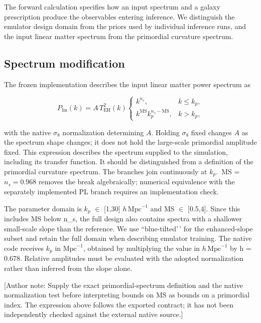 The forward calculation specifies how an input spectrum and a galaxy prescription produce the observables entering inference. We distinguish the emulator design domain from the priors used by individual inference runs, and the input linear matter spectrum from the primordial curvature spectrum.

\subsection{Spectrum modification}\label{spectrum-modification}

The frozen implementation describes the input linear matter power spectrum as

\[
P_{\mathrm{lin}}(k)=A\,T_{\mathrm{EH}}^2(k)
\begin{cases}
k^{n_s}, & k\leq k_p,\\
k^{\mathrm{MS}}k_p^{n_s-\mathrm{MS}}, & k>k_p,
\end{cases}
\]

with the native $\sigma_8$ normalization determining $A$. Holding $\sigma_8$ fixed changes $A$ as the spectrum shape changes; it does not hold the large-scale primordial amplitude fixed. This expression describes the spectrum supplied to the simulation, including its transfer function. It should be distinguished from a definition of the primordial curvature spectrum. The branches join continuously at \ensuremath{k_p}.~MS = $n_s=0.968$ removes the break algebraically; numerical equivalence with the separately implemented PL branch requires an implementation check.

The parameter domain is \ensuremath{k_p} \(\in\) {[}1,30{]} $h\,\mathrm{Mpc}^{-1}$ and MS \(\in\) {[}0.5,4{]}. Since this includes MS below n\_s, the full design also contains spectra with a shallower small-scale slope than the reference. We use ``blue-tilted'\,' for the enhanced-slope subset and retain the full domain when describing emulator training. The native code receives \ensuremath{k_p} in $\mathrm{Mpc}^{-1}$, obtained by multiplying the value in $h\,\mathrm{Mpc}^{-1}$ by h = 0.678. Relative amplitudes must be evaluated with the adopted normalization rather than inferred from the slope alone.

{[}Author note: Supply the exact primordial-spectrum definition and the native normalization test before interpreting bounds on MS as bounds on a primordial index. The expression above follows the exported contract; it has not been independently checked against the external native source.{]}

